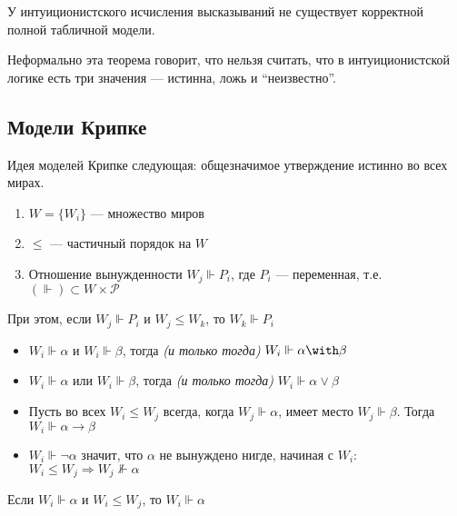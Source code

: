 \begin{theorem}
    У интуиционистского исчисления высказываний не существует корректной полной табличной модели.
\end{theorem}

Неформально эта теорема говорит, что нельзя считать, что в интуиционистской логике есть три значения --- истинна, ложь и ``неизвестно''.

\subsection{Модели Крипке}

Идея моделей Крипке следующая: общезначимое утверждение истинно во всех мирах.

\begin{definition}\itemfix
    \begin{enumerate}
        \item \(W = \{W_i\}\) --- множество миров
        \item \( \leq \) --- частичный порядок на \(W\)
        \item Отношение вынужденности \(W_j \Vdash P_i\), где \(P_i\) --- переменная, т.е. \((\Vdash) \subset W \times \mathcal{P}\)
    \end{enumerate}

    При этом, если \(W_j \Vdash P_i\) и \(W_j \leq W_k\), то \(W_k \Vdash P_i\)
\end{definition}

\begin{definition}\itemfix
    \begin{itemize}
        \item \(W_i \Vdash \alpha\) и \(W_i \Vdash \beta\), тогда \textit{(и только тогда)} \(W_i \Vdash \alpha \with \beta\)
        \item \(W_i \Vdash \alpha\) или \(W_i \Vdash \beta\), тогда \textit{(и только тогда)} \(W_i \Vdash \alpha \lor \beta\)
        \item Пусть во всех \(W_i \leq W_j\) всегда, когда \(W_j \Vdash \alpha\), имеет место \(W_j \Vdash \beta\). Тогда \(W_i \Vdash \alpha \to \beta\)
        \item \(W_i \Vdash \neg \alpha\) значит, что \(\alpha\) не вынуждено нигде, начиная с \(W_i\): \(W_i \leq W_j \Rightarrow W_j \nVdash \alpha\)
    \end{itemize}
\end{definition}

\begin{theorem}
    Если \(W_i \Vdash \alpha\) и \(W_i \leq W_j\), то \(W_i \Vdash \alpha\)
\end{theorem}

